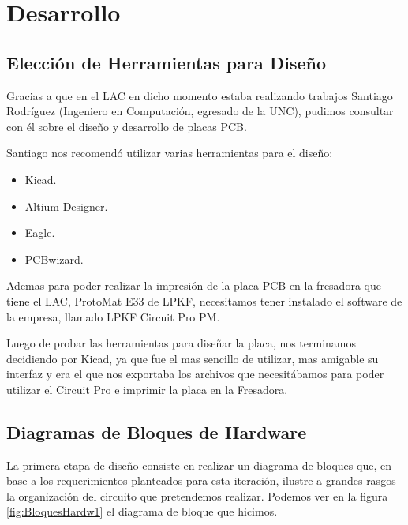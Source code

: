
\section{Desarrollo} %
\label{it3:sec:desarrollo}

\subsection{Elección de Herramientas para Diseño} %
\label{it3:sec:herramientas_para_diseno}

Gracias a que en el LAC en dicho momento estaba realizando trabajos Santiago Rodríguez (Ingeniero en Computación, egresado de la UNC), pudimos consultar con él sobre el diseño y desarrollo de placas PCB. 

Santiago nos recomendó utilizar varias herramientas para el diseño:
\begin{itemize}
\item Kicad.
\item Altium Designer.
\item Eagle.
\item PCBwizard.
\end{itemize}

Ademas para poder realizar la impresión de la placa PCB en la fresadora que tiene el LAC, ProtoMat E33 de LPKF, necesitamos tener instalado el software de la empresa, llamado LPKF Circuit Pro PM.

Luego de probar las herramientas para diseñar la placa, nos terminamos decidiendo por Kicad, ya que fue el mas sencillo de utilizar, mas amigable su interfaz y era el que nos exportaba los archivos que necesitábamos para poder utilizar el Circuit Pro e imprimir la placa en la Fresadora.


\subsection{Diagramas de Bloques de Hardware}
\label{diagra_bloques_hardware}

La primera etapa de diseño consiste en realizar un diagrama de bloques que, en base a los requerimientos planteados para esta iteración, ilustre a grandes rasgos la organización del circuito que pretendemos realizar.
Podemos ver en la figura \ref{fig:BloquesHardw1} el diagrama de bloque que hicimos.

